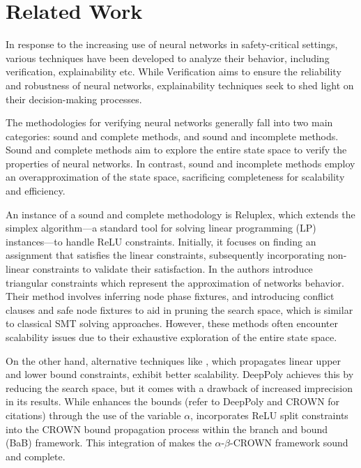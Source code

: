\section{Related Work}

In response to the increasing use of neural networks in safety-critical settings, 
various techniques have been developed to analyze their behavior, including 
verification, explainability etc. While Verification aims to ensure 
the reliability and robustness of neural networks, 
explainability techniques seek to shed light on their decision-making processes. 

The methodologies for verifying neural networks generally fall into two main
categories: sound and complete methods, and sound and incomplete methods. 
Sound and complete methods aim to explore the entire state space to verify 
the properties of neural networks. In contrast, sound and incomplete methods 
employ an overapproximation of the state space, sacrificing completeness for 
scalability and efficiency.

An instance of a sound and complete methodology is Reluplex, which extends the 
simplex algorithm—a standard tool for solving linear programming (LP) instances—to 
handle ReLU constraints. Initially, it focuses on finding an assignment that 
satisfies the linear constraints, subsequently incorporating non-linear constraints 
to validate their satisfaction. In  
the authors introduce triangular constraints which represent the approximation of networks
behavior. Their method involves inferring node phase fixtures,
and introducing conflict clauses and safe node fixtures to aid in pruning the search 
space, which is similar to classical SMT solving approaches. However, these methods
often encounter scalability issues due to their exhaustive exploration of the
entire state space. 

On the other hand, alternative techniques like , which
propagates linear upper and lower bound constraints, exhibit better
scalability. DeepPoly achieves this by reducing the search space, but it comes with 
a drawback of increased imprecision in its results. While  
enhances the bounds (refer to DeepPoly and CROWN for citations) through the use 
of the variable $\alpha$,  incorporates ReLU split
constraints into the CROWN bound propagation process within the branch and bound
(BaB) framework. This integration of  makes the 
$\alpha$-$\beta$-CROWN framework sound and complete.


